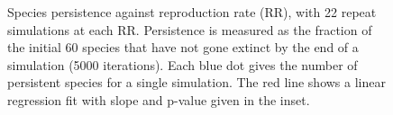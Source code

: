 \begin{figure}
	\centering	
	\renewcommand{\thesubfigure}{}
	\setlength{\subfloatlabelskip}{0pt}
	\caption{Species persistence against reproduction rate (RR), with 22 repeat simulations at each RR. Persistence is measured as the fraction of the initial 60 species that have not gone extinct by the end of a simulation (5000 iterations). Each blue dot gives the number of persistent species for a single simulation. The red line shows a linear regression fit with slope and p-value given in the inset.}
	\label{fig:rr_v_species_persistence}
\end{figure}


